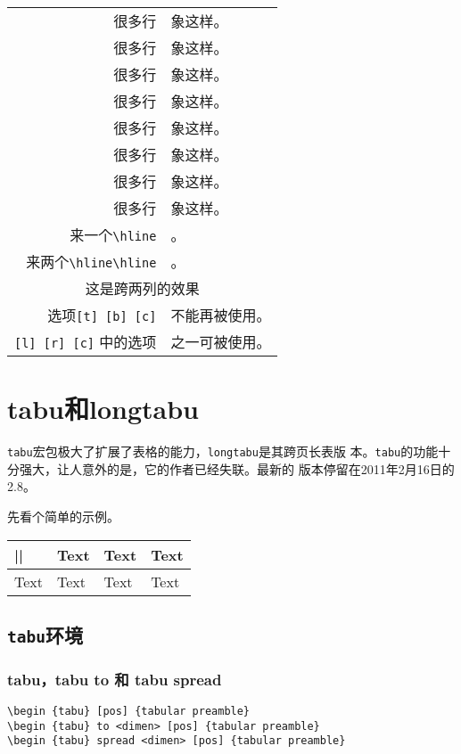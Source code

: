 \documentclass{article}
\begin{document}
\begin{longtable}{@{*}r||p{2in}@{*}}
  很多行                            & 象这样。 \\
  很多行                            & 象这样。 \\
  很多行                            & 象这样。 \\
  很多行                            & 象这样。 \\
  很多行                            & 象这样。 \\
  很多行                            & 象这样。 \\
  很多行                            & 象这样。 \\
  很多行                            & 象这样。 \\
  来一个\verb!\hline!            & 。   \\
  \hline
  来两个\verb!\hline\hline!   & 。 \\
  \hline\hline 
  \multicolumn{2}{|c|}{这是跨两列的效果} \\
    选项\verb![t] [b] [c]!    & 不能再被使用。  \\
    \verb![l] [r] [c]! 中的选项 &  之一可被使用。 \\
\end{longtable}
  
\section{tabu和longtabu}

\texttt{tabu}宏包极大了扩展了表格的能力，\texttt{longtabu}是其跨页长表版
本。\texttt{tabu}的功能十分强大，让人意外的是，它的作者已经失联。最新的
版本停留在2011年2月16日的2.8。

先看个简单的示例。

\begin{tabu} to 140mm {|X[1,l] | X[2,c] | X[3,c] | X[1,r] | }
\hline
|\dotfill | & Text  & Text & Text \\ 
\hline
Text & Text & Text & Text  \\
\end{tabu}

\subsection{\texttt{tabu}环境}

\subsubsection{tabu，tabu to 和 tabu spread}
\begin{verbatim}
\begin {tabu} [pos] {tabular preamble}
\begin {tabu} to <dimen> [pos] {tabular preamble}
\begin {tabu} spread <dimen> [pos] {tabular preamble}
\end{verbatim}
\end{document}
